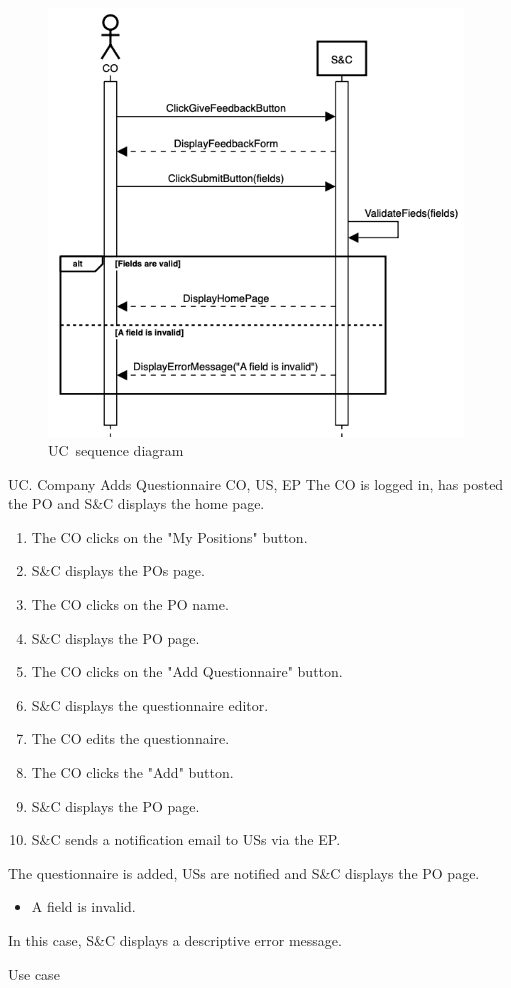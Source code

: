 \begin{figure}[h]
    \centering
    \includegraphics[width=11cm]{images/sequence-diagrams/company-fills-out-feedback-form.png}
    \caption{UC\theuc\ sequence diagram}
\end{figure}


\clearpage

\begin{usecase}
    {UC\theuc. Company Adds Questionnaire}
    {CO, US, EP}
    {The CO is logged in, has posted the PO and S\&C displays the home page.}
    {\begin{enumerate}[leftmargin=*]
        \item The CO clicks on the "My Positions" button.
        \item S\&C displays the POs page.
        \item The CO clicks on the PO name.
        \item S\&C displays the PO page.
        \item The CO clicks on the "Add Questionnaire" button.
        \item S\&C displays the questionnaire editor.
        \item The CO edits the questionnaire.
        \item The CO clicks the "Add" button.
        \item S\&C displays the PO page.
        \item S\&C sends a notification email to USs via the EP.
    \end{enumerate}}
    {The questionnaire is added, USs are notified and S\&C displays the PO page.}
    {\begin{itemize}[leftmargin=*, label=\tiny\textbullet]
        \item A field is invalid.
    \end{itemize}
    In this case, S\&C displays a descriptive error message.}
    {Use case \theuc}
\end{usecase}

